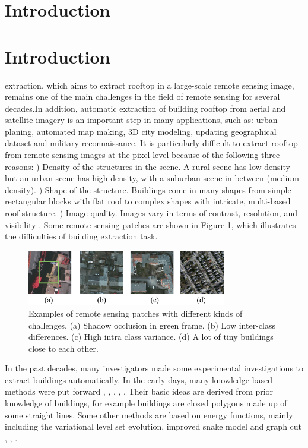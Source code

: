 %
\section{Introduction}
\label{sec:intro}
\section{Introduction}
 extraction, which aims to extract rooftop in a large-scale remote sensing image, remains one of the main challenges in the field of remote sensing for several decades.In addition, automatic extraction of building rooftop from aerial and satellite imagery is an important step in many applications, such as: urban planing, automated map making, 3D city modeling, updating geographical dataset and military reconnaissance. It is particularly difficult to extract rooftop from remote sensing images at the pixel level because of the following three reasons: ) Density of the structures in the scene. A rural scene has low density but an urban scene has high density, with a suburban scene in between (medium density).  ) Shape of the structure. Buildings come in many shapes from simple rectangular blocks with flat roof to complex shapes with intricate, multi-based roof structure.  ) Image quality. Images vary in terms of contrast, resolution, and visibility  \cite{IEEEexample:huertas1988detecting}. Some remote sensing patches are shown in Figure 1, which illustrates the difficulties of building extraction task. \par
\begin{figure}
\includegraphics[width=8.7cm]{Figures/challenge.eps}
\caption{Examples of remote sensing patches with different kinds of challenges. (a) Shadow occlusion in green frame. (b) Low inter-class differences. (c) High intra class variance. (d) A lot of tiny buildings close to each other.}
\label{1}
\end{figure}
\setlength{\parindent}{2ex}In the past decades, many investigators made some experimental investigations to extract buildings automatically. In the early days, many knowledge-based methods were put forward \cite{IEEEexample:huertas1988detecting}, \cite{IEEEexample:noronha2001detection}, \cite{IEEEexample:nosrati2009novel}, \cite{IEEEexample:izadi2012three}, \cite{IEEEexample:wang2015efficient}. Their basic ideas are derived from prior knowledge of buildings, for example buildings are closed polygons made up of some straight lines. Some other methods are based on energy functions, mainly including the variational level set evolution, improved snake model and graph cut \cite{IEEEexample:cote2013automatic}, \cite{IEEEexample:peng2005improved}, \cite{IEEEexample:sirmacek2009urban}.\par

